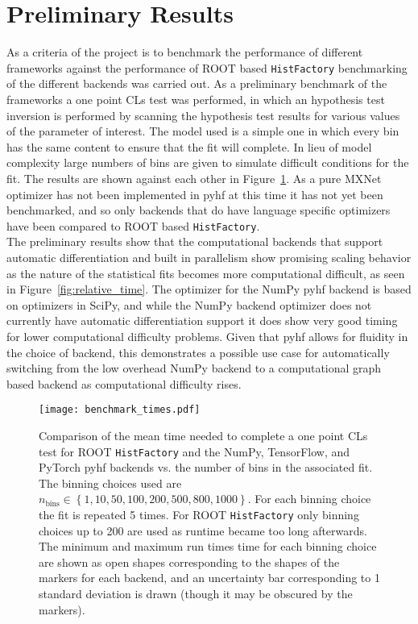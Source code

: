 \section{Preliminary Results}\label{section:results}

As a criteria of the project is to benchmark the performance of different frameworks against the performance of ROOT based \texttt{HistFactory} benchmarking of the different backends was carried out.
As a preliminary benchmark of the frameworks a one point CLs test was performed, in which an hypothesis test inversion is performed by scanning the hypothesis test results for various values of the parameter of interest.
The model used is a simple one in which every bin has the same content to ensure that the fit will complete.
In lieu of model complexity large numbers of bins are given to simulate difficult conditions for the fit.
The results are shown against each other in Figure~\ref{fig:benchmark_backends}.
As a pure MXNet optimizer has not been implemented in pyhf at this time it has not yet been benchmarked, and so only backends that do have language specific optimizers have been compared to ROOT based \texttt{HistFactory}.\\

The preliminary results show that the computational backends that support automatic differentiation and built in parallelism show promising scaling behavior as the nature of the statistical fits becomes more computational difficult, as seen in Figure~\ref{fig:relative_time}.
The optimizer for the NumPy pyhf backend is based on optimizers in SciPy, and while the NumPy backend optimizer does not currently have automatic differentiation support it does show very good timing for lower computational difficulty problems.
Given that pyhf allows for fluidity in the choice of backend, this demonstrates a possible use case for automatically switching from the low overhead NumPy backend to a computational graph based backend as computational difficulty rises.

\begin{figure}
 \centering
 \texttt{[image: benchmark\_times.pdf]}
 \caption{Comparison of the mean time needed to complete a one point CLs test for ROOT \texttt{HistFactory} and the NumPy, TensorFlow, and PyTorch pyhf backends vs. the number of bins in the associated fit.
  The binning choices used are $n_{\text{bins}} \in \left\{1, 10, 50, 100, 200, 500, 800, 1000\right\}$.
  For each binning choice the fit is repeated 5 times.
  For ROOT \texttt{HistFactory} only binning choices up to 200 are used as runtime became too long afterwards.
  The minimum and maximum run times time for each binning choice are shown as open shapes corresponding to the shapes of the markers for each backend, and an uncertainty bar corresponding to 1 standard deviation is drawn (though it may be obscured by the markers).
 }\label{fig:benchmark_backends}
\end{figure}

